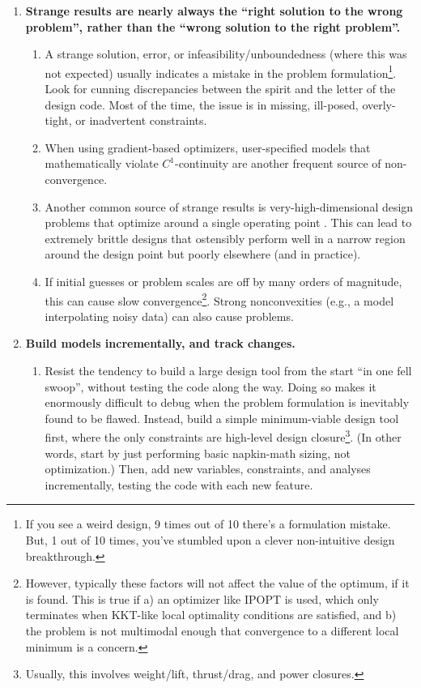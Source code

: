 \begin{enumerate}
\begin{enumerate}
    \end{enumerate}
    \item \textbf{Strange results are nearly always the ``right solution to the wrong problem'', rather than the ``wrong solution to the right problem''.}
    \begin{enumerate}
        \item A strange solution, error, or infeasibility/unboundedness (where this was not expected) usually indicates a mistake in the problem formulation\footnote{If you see a weird design, 9 times out of 10 there's a formulation mistake. But, 1 out of 10 times, you've stumbled upon a clever non-intuitive design breakthrough.}. Look for cunning discrepancies between the spirit and the letter of the design code. Most of the time, the issue is in missing, ill-posed, overly-tight, or inadvertent constraints.
        \item When using gradient-based optimizers, user-specified models that mathematically violate $C^1$-continuity are another frequent source of non-convergence.
        \item Another common source of strange results is very-high-dimensional design problems that optimize around a single operating point \cite{drela_pros_1998}. This can lead to extremely brittle designs that ostensibly perform well in a narrow region around the design point but poorly elsewhere (and in practice).
        \item If initial guesses or problem scales are off by many orders of magnitude, this can cause slow convergence\footnote{However, typically these factors will not affect the value of the optimum, if it is found. This is true if a) an optimizer like IPOPT is used, which only terminates when KKT-like local optimality conditions are satisfied, and b) the problem is not multimodal enough that convergence to a different local minimum is a concern.}. Strong nonconvexities (e.g., a model interpolating noisy data) can also cause problems.
    \end{enumerate}
    \item \textbf{Build models incrementally, and track changes.}
    \begin{enumerate}
        \item Resist the tendency to build a large design tool from the start ``in one fell swoop'', without testing the code along the way. Doing so makes it enormously difficult to debug when the problem formulation is inevitably found to be flawed. Instead, build a simple minimum-viable design tool first, where the only constraints are high-level design closure\footnote{Usually, this involves weight/lift, thrust/drag, and power closures.}. (In other words, start by just performing basic napkin-math sizing, not optimization.) Then, add new variables, constraints, and analyses incrementally, testing the code with each new feature.

\end{enumerate}
\end{enumerate}

